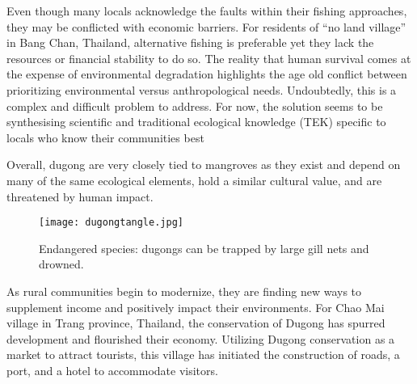 Even though many locals acknowledge the faults within their fishing approaches, they may be conflicted with economic barriers. For residents of ``no land village'' in Bang Chan, Thailand, alternative fishing is preferable yet they lack the resources or financial stability to do so.  The reality that human survival comes at the expense of environmental degradation highlights the age old conflict between prioritizing environmental versus anthropological  needs. Undoubtedly, this is a complex and difficult problem to address. For now, the solution seems to be synthesising scientific and traditional ecological knowledge (TEK) specific to locals who know their communities best %




  
  Overall, dugong are very closely tied to mangroves as they exist and depend on many of the same ecological elements, hold a similar cultural value, and are threatened by human impact.


\begin{figure}[!h]
    \centering
    \texttt{[image: dugongtangle.jpg]}
    \caption {Endangered species: dugongs can be trapped by large gill nets and drowned.}
    \label{fig:dugongtangle}
\end{figure}


  As rural communities begin to modernize, they are finding new ways to supplement income and positively impact their environments. For Chao Mai village in Trang province, Thailand, the conservation of Dugong has spurred development and flourished their economy. Utilizing Dugong conservation as a market to attract tourists, this village has initiated the construction of roads, a port, and a hotel to accommodate visitors. 


